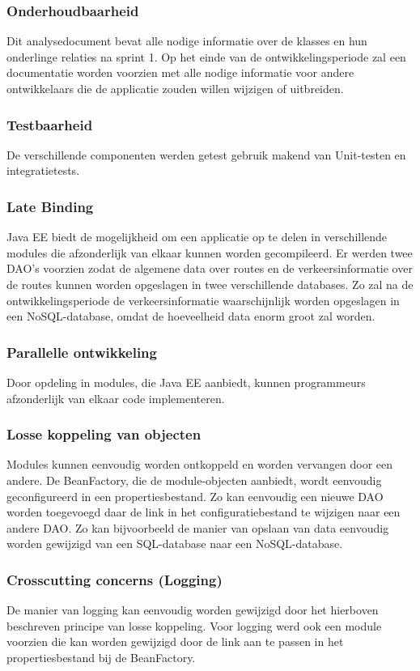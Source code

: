 \documentclass[ps,a4paper,oneside]{report}
\begin{document}
\subsubsection{Onderhoudbaarheid}
Dit analysedocument bevat alle nodige informatie over de klasses en hun onderlinge relaties na sprint 1. Op het einde van de ontwikkelingsperiode zal een documentatie worden voorzien met alle nodige informatie voor andere ontwikkelaars die de applicatie zouden willen wijzigen of uitbreiden.
\subsubsection{Testbaarheid}
De verschillende componenten werden getest gebruik makend van Unit-testen en integratietests.
\subsubsection{Late Binding}
Java EE biedt de mogelijkheid om een applicatie op te delen in verschillende modules die afzonderlijk van elkaar kunnen worden gecompileerd. Er werden twee DAO’s voorzien zodat de algemene data over routes en de verkeersinformatie over de routes kunnen worden opgeslagen in twee verschillende databases. Zo zal na de ontwikkelingsperiode de verkeersinformatie waarschijnlijk worden opgeslagen in een NoSQL-database, omdat de hoeveelheid data enorm groot zal worden. 
\subsubsection{Parallelle ontwikkeling}
Door opdeling in modules, die Java EE aanbiedt, kunnen programmeurs afzonderlijk van elkaar code implementeren.
\subsubsection{Losse koppeling van objecten}
Modules kunnen eenvoudig worden ontkoppeld en worden vervangen door een andere. De BeanFactory, die de module-objecten aanbiedt, wordt eenvoudig geconfigureerd in een propertiesbestand. Zo kan eenvoudig een nieuwe DAO worden toegevoegd daar de link in het configuratiebestand te wijzigen naar een andere DAO. Zo kan bijvoorbeeld de manier van opslaan van data eenvoudig worden gewijzigd van een SQL-database naar een NoSQL-database.
\subsubsection{Crosscutting concerns (Logging)}
De manier van logging kan eenvoudig worden gewijzigd door het hierboven beschreven principe van losse koppeling. Voor logging werd ook een module voorzien die kan worden gewijzigd door de link aan te passen in het propertiesbestand bij de BeanFactory.
\end{document}
